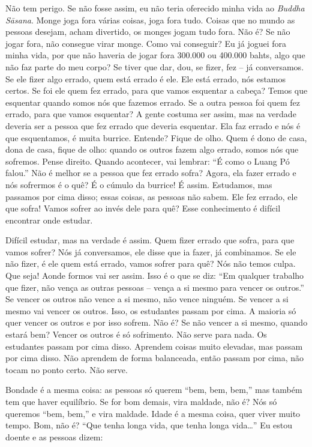 Não tem perigo. Se não fosse assim, eu não teria oferecido minha
vida ao \textit{Buddha Sāsana}. Monge joga fora várias coisas, joga
fora tudo. Coisas que no mundo as pessoas desejam, acham divertido, os
monges jogam tudo fora. Não é? Se não jogar fora, não consegue virar
monge. Como vai conseguir? Eu já joguei fora minha vida, por que não
haveria de jogar fora 300.000 ou 400.000 bahts, algo que não faz parte
do meu corpo? Se tiver que dar, dou, se fizer, fez – já conversamos. Se
ele fizer algo errado, quem está errado é ele. Ele está errado, nós
estamos certos. Se foi ele quem fez errado, para que vamos esquentar a
cabeça? Temos que esquentar quando somos nós que fazemos errado. Se a
outra pessoa foi quem fez errado, para que vamos esquentar? A gente
costuma ser assim, mas na verdade deveria ser a pessoa que fez errado
que deveria esquentar. Ela faz errado e nós é que esquentamos, é muita
burrice. Entende? Fique de olho. Quem é dono de casa, dona de casa,
fique de olho: quando os outros fazem algo errado, somos nós que
sofremos. Pense direito. Quando acontecer, vai lembrar: “É como o Luang
Pó falou.” Não é melhor se a pessoa que fez errado sofra? Agora, ela
fazer errado e nós sofrermos é o quê? É o cúmulo da burrice! É assim.
Estudamos, mas passamos por cima disso; essas coisas, as pessoas não
sabem. Ele fez errado, ele que sofra! Vamos sofrer ao invés dele para
quê? Esse conhecimento é difícil encontrar onde estudar.

Difícil estudar, mas na verdade é assim. Quem fizer errado que
sofra, para que vamos sofrer? Nós já conversamos, ele disse que ia
fazer, já combinamos. Se ele não fizer, é ele quem está errado, vamos
sofrer para quê? Nós não temos culpa. Que seja! Aonde formos vai ser
assim. Isso é o que se diz: “Em qualquer trabalho que fizer, não vença
as outras pessoas – vença a si mesmo para vencer os outros.” Se vencer
os outros não vence a si mesmo, não vence ninguém. Se vencer a si mesmo
vai vencer os outros. Isso, os estudantes passam por cima. A maioria só
quer vencer os outros e por isso sofrem. Não é? Se não vencer a si
mesmo, quando estará bem? Vencer os outros é só sofrimento. Não serve
para nada. Os estudantes passam por cima disso. Aprendem coisas muito
elevadas, mas passam por cima disso. Não aprendem de forma balanceada,
então passam por cima, não tocam no ponto certo. Não serve.

Bondade é a mesma coisa: as pessoas só querem “bem, bem, bem,” mas
também tem que haver equilíbrio. Se for bom demais, vira maldade, não
é? Nós só queremos “bem, bem,” e vira maldade. Idade é a mesma coisa,
quer viver muito tempo. Bom, não é? “Que tenha longa vida, que tenha
longa vida…” Eu estou doente e as pessoas dizem: 

